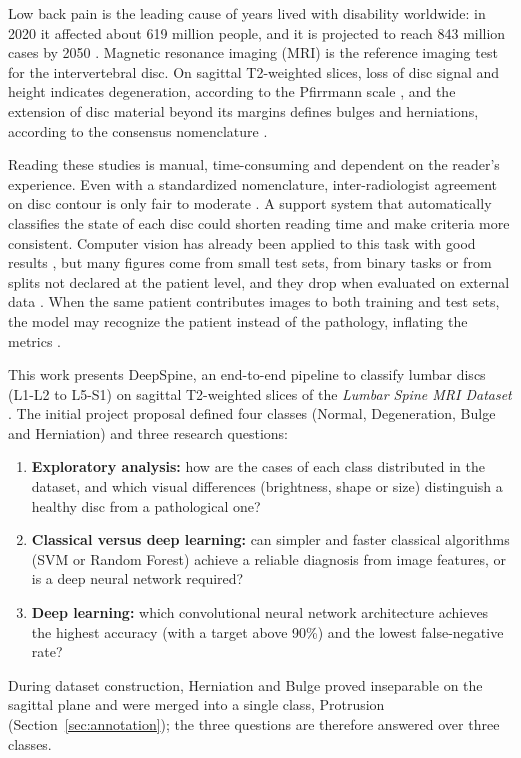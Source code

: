 Low back pain is the leading cause of years lived with disability worldwide: in 2020 it affected about 619 million people, and it is projected to reach 843 million cases by 2050 \cite{gbd2023}. Magnetic resonance imaging (MRI) is the reference imaging test for the intervertebral disc. On sagittal T2-weighted slices, loss of disc signal and height indicates degeneration, according to the Pfirrmann scale \cite{pfirrmann2001}, and the extension of disc material beyond its margins defines bulges and herniations, according to the consensus nomenclature \cite{fardon2014}.

Reading these studies is manual, time-consuming and dependent on the reader's experience. Even with a standardized nomenclature, inter-radiologist agreement on disc contour is only fair to moderate \cite{arana2011}. A support system that automatically classifies the state of each disc could shorten reading time and make criteria more consistent. Computer vision has already been applied to this task with good results \cite{sari2025,tan2024,sayed2025scirep,wang2025}, but many figures come from small test sets, from binary tasks or from splits not declared at the patient level, and they drop when evaluated on external data \cite{yi2023,nigru2024}. When the same patient contributes images to both training and test sets, the model may recognize the patient instead of the pathology, inflating the metrics \cite{brunekreef2024,rumala2023}.

This work presents DeepSpine, an end-to-end pipeline to classify lumbar discs (L1-L2 to L5-S1) on sagittal T2-weighted slices of the \emph{Lumbar Spine MRI Dataset} \cite{sudirman2019}. The initial project proposal defined four classes (Normal, Degeneration, Bulge and Herniation) and three research questions:
\begin{enumerate}
  \item[Q1.] \textbf{Exploratory analysis:} how are the cases of each class distributed in the dataset, and which visual differences (brightness, shape or size) distinguish a healthy disc from a pathological one?
  \item[Q2.] \textbf{Classical versus deep learning:} can simpler and faster classical algorithms (SVM or Random Forest) achieve a reliable diagnosis from image features, or is a deep neural network required?
  \item[Q3.] \textbf{Deep learning:} which convolutional neural network architecture achieves the highest accuracy (with a target above 90\%) and the lowest false-negative rate?
\end{enumerate}
During dataset construction, Herniation and Bulge proved inseparable on the sagittal plane and were merged into a single class, Protrusion (Section~\ref{sec:annotation}); the three questions are therefore answered over three classes.

